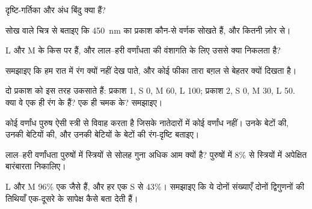 \begin{exercise}[$\star$]\label{exo:g11:the-eye:3}
दृष्टि-गर्तिका और अंध बिंदु क्या हैं?
\end{exercise}

\begin{exercise}[$\star$]\label{exo:g11:the-eye:4}
सोख वाले चित्र से बताइए कि \qty{450}{nm} का प्रकाश कौन-से वर्णक सोखते हैं,
और कितनी ज़ोर से।
\end{exercise}

\begin{exercise}[$\star$]\label{exo:g11:the-eye:5}
L और M  के  किस  पर हैं, और लाल--हरी वर्णांधता की
वंशागति के लिए उससे क्या निकलता है?
\end{exercise}

\begin{exercise}[$\star\star$]\label{exo:g11:the-eye:6}
समझाइए कि हम रात में रंग क्यों नहीं देख पाते, और कोई फीका तारा बग़ल से
बेहतर क्यों दिखता है।
\end{exercise}

\begin{exercise}[$\star\star$]\label{exo:g11:the-eye:7}
दो प्रकाश  को इस तरह उकसाते हैं: प्रकाश 1, S 0, M 60, L 100; प्रकाश
2, S 0, M 30, L 50. क्या वे एक ही रंग के हैं? एक ही चमक के? समझाइए।
\end{exercise}

\begin{exercise}[$\star\star$]\label{exo:g11:the-eye:8}
कोई वर्णांध पुरुष ऐसी स्त्री से विवाह करता है जिसके नातेदारों में कोई
वर्णांध नहीं। उनके बेटों की, उनकी बेटियों की, और उनकी बेटियों के बेटों की
रंग-दृष्टि बताइए।
\end{exercise}

\begin{exercise}[$\star\star$]\label{exo:g11:the-eye:9}
लाल--हरी वर्णांधता पुरुषों में स्त्रियों से सोलह गुना अधिक आम क्यों है?
पुरुषों में 8\% से स्त्रियों में अपेक्षित बारंबारता निकालिए।
\end{exercise}

\begin{exercise}[$\star\star$]\label{exo:g11:the-eye:10}
L और M  96\% एक जैसे हैं, और हर एक S से 43\%। समझाइए कि ये दोनों
संख्याएँ दोनों द्विगुणनों की तिथियाँ एक-दूसरे के सापेक्ष कैसे बता देती हैं।
\end{exercise}


